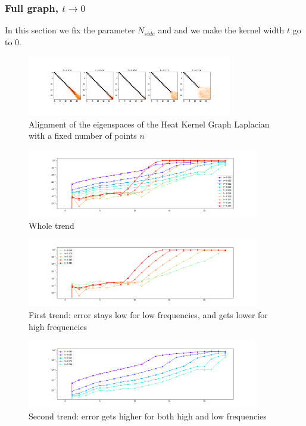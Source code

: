 \subsubsection{Full graph, $t\to 0$}
In this section we fix the parameter $N_{side}$ and and we make the kernel width $t$ go to $0$. 
\begin{figure}[h]
	\centering
	\includegraphics[width=0.8\textwidth]{../codes/02.HeatKernelGraphLaplacian/HEALPix/06_figures/t_sensitivity}
	\caption{\label{fig:t_sensitivity_eigenspaces}Alignment of the eigenspaces of the Heat Kernel Graph Laplacian with a fixed number of points $n$}
\end{figure}
\begin{figure}
	\centering
	\includegraphics[width=0.9\textwidth]{../codes/02.HeatKernelGraphLaplacian/HEALPix/06_figures/t_sensitivity_diagonal.png}
	\caption{\label{fig:t_sensitivity_diagonal}Whole trend}
\end{figure}%
\begin{figure}
	\centering
	\includegraphics[width=0.9\textwidth]{../codes/02.HeatKernelGraphLaplacian/HEALPix/06_figures/t_sensitivity_diagonal_2.png}
	\caption{\label{fig:t_sensitivity_diagonal_2}First trend: error stays low for low frequencies, and gets lower for high frequencies}
	\vspace{0.5cm}
\end{figure}
\begin{figure}
	\centering
	\includegraphics[width=0.9\textwidth]{../codes/02.HeatKernelGraphLaplacian/HEALPix/06_figures/t_sensitivity_diagonal_1.png}
	\caption{\label{fig:t_sensitivity_diagonal_1}Second trend: error gets higher for both high and low frequencies}
\end{figure}%

